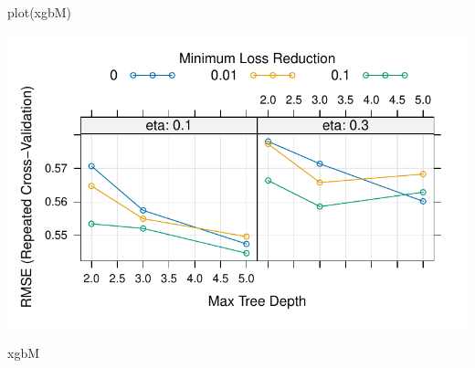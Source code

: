 \documentclass[
  letterpaper,
  DIV=11,
  numbers=noendperiod]{scrreprt}
\newenvironment{Shaded}{\begin{snugshade}}{\end{snugshade}}
\newcommand{\FunctionTok}[1]{\textcolor[rgb]{0.28,0.35,0.67}{#1}}
\newcommand{\NormalTok}[1]{\textcolor[rgb]{0.00,0.23,0.31}{#1}}
\begin{document}
\begin{Shaded}
\begin{Highlighting}[]
\FunctionTok{plot}\NormalTok{(xgbM)}
\end{Highlighting}
\end{Shaded}

\includegraphics{03_HyperparameterTuning_files/figure-pdf/unnamed-chunk-8-2.pdf}

\begin{Shaded}
\begin{Highlighting}[]
\NormalTok{xgbM}
\end{Highlighting}
\end{Shaded}
\end{document}
